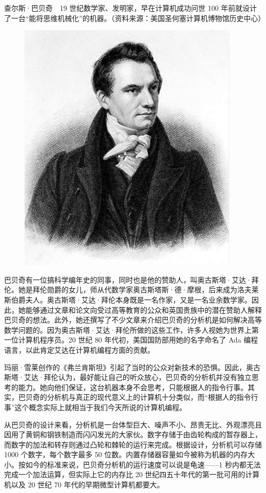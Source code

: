\documentclass[12pt,UTF8]{ctexbook}
\begin{document}
查尔斯·巴贝奇　19 世纪数学家、发明家，早在计算机成功问世 100 年前就设计了一台“能将思维机械化”的机器。（资料来源：美国圣何塞计算机博物馆历史中心）

\begin{figure}[htbp]
	\centering
	\includegraphics[width=0.7\linewidth]{1}
	\caption{}
	\label{fig:1}
\end{figure}

巴贝奇有一位搞科学编年史的同事，同时也是他的赞助人，叫奥古斯塔·艾达·拜伦。她是拜伦勋爵的女儿，师从代数学家奥古斯塔斯·德·摩根，后来成为洛夫莱斯伯爵夫人。奥古斯塔·艾达·拜伦本身既是一名作家，又是一名业余数学家。因此，她能够通过文章和论文向受过高等教育的公众和英国贵族中的潜在赞助人解释巴贝奇的想法。此外，她还撰写了不少文章来介绍巴贝奇的分析机是如何解决高等数学问题的。因为奥古斯塔·艾达·拜伦所做的这些工作，许多人视她为世界上第一位计算机程序员。20 世纪 80 年代初，美国国防部用她的名字命名了 Ada 编程语言，以此肯定艾达在计算机编程方面的贡献。

玛丽·雪莱创作的《弗兰肯斯坦》引起了当时的公众对新技术的恐惧。因此，奥古斯塔·艾达·拜伦认为，最好能让自己的听众放心，巴贝奇的分析机并没有独立思考的能力。她向他们保证，这台机器本身不会思考，只能根据人的指令行事。其实，巴贝奇的分析机与真正的现代意义上的计算机十分类似，而“根据人的指令行事”这个概念实际上就相当于我们今天所说的计算机编程。

从巴贝奇的设计来看，分析机是一台体型巨大、噪声不小、昂贵无比、外观漂亮且因用了黄铜和钢铁制造而闪闪发光的大家伙。数字存储于由齿轮构成的暂存器上，而数字的加法和转存则通过凸轮和棘轮的运行来完成。根据设计，分析机可以存储 1000 个数字，每个数字最多 50 位数。内置存储器容量如今被称为机器的内存大小。按如今的标准来说，巴贝奇分析机的运行速度可以说是龟速——1 秒内都无法完成一个加法运算，但实际上它的内存比 20 世纪四五十年代的第一批可用的计算机以及 20 世纪 70 年代的早期微型计算机都要大。
\end{document}
